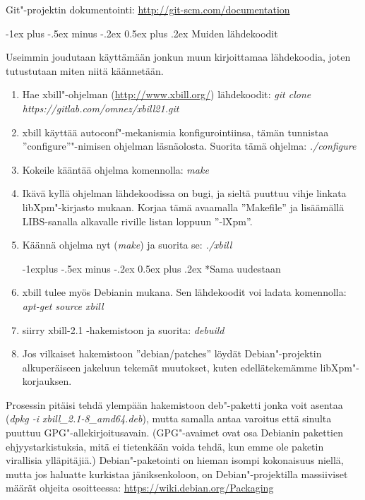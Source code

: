 \documentclass[12pt,portrait,a4]{article}
\makeatletter
\renewcommand{\section}{\@startsection{section}{1}{0mm}%
                                {-1ex plus -.5ex minus -.2ex}%
                                {0.5ex plus .2ex}%
                                {\normalfont\large\bfseries}}
\renewcommand{\subsection}{\@startsection{subsection}{2}{0mm}%
                                {-1explus -.5ex minus -.2ex}%
                                {0.5ex plus .2ex}%
                                {\normalfont\normalsize\bfseries}}
\makeatother
\begin{document}
Git"-projektin dokumentointi: \url{http://git-scm.com/documentation}


\section{Muiden lähdekoodit}

Useimmin joudutaan käyttämään jonkun muun kirjoittamaa lähdekoodia, joten
tutustutaan miten niitä käännetään.

\begin{enumerate}
\item Hae xbill"-ohjelman (\url{http://www.xbill.org/}) lähdekoodit:
\emph{git clone https://gitlab.com/omnez/xbill21.git}
\item xbill käyttää autoconf"-mekanismia konfigurointiinsa, tämän tunnistaa
''configure''"-nimisen ohjelman läsnäolosta.  Suorita tämä ohjelma:
\emph{./configure}
\item Kokeile kääntää ohjelma komennolla: \emph{make}
\item Ikävä kyllä ohjelman lähdekoodissa on bugi, ja sieltä puuttuu vihje
linkata libXpm"-kirjasto mukaan.  Korjaa tämä avaamalla ''Makefile'' ja
lisäämällä LIBS-sanalla alkavalle riville listan loppuun ''-lXpm''.
\item Käännä ohjelma nyt (\emph{make}) ja suorita se: \emph{./xbill}

\subsection*{Sama uudestaan}

\item xbill tulee myös Debianin mukana.  Sen lähdekoodit voi ladata
komennolla: \emph{apt-get source xbill}
\item siirry xbill-2.1 -hakemistoon ja suorita: \emph{debuild}
\item Jos vilkaiset hakemistoon ''debian/patches'' löydät Debian"-projektin
alkuperäiseen jakeluun tekemät muutokset, kuten edellätekemämme
libXpm"-korjauksen.
\end{enumerate}

Prosessin pitäisi tehdä ylempään hakemistoon deb"-paketti jonka voit asentaa
(\emph{dpkg -i xbill\_2.1-8\_amd64.deb}), mutta samalla antaa varoitus että
sinulta puuttuu GPG"-allekirjoitusavain.  (GPG"-avaimet ovat osa Debianin
pakettien ehjyystarkistuksia, mitä ei tietenkään voida tehdä, kun emme ole
paketin virallisia ylläpitäjiä.) Debian"-paketointi on hieman isompi
kokonaisuus niellä, mutta jos haluatte kurkistaa jäniksenkoloon, on
Debian"-projektilla massiiviset määrät ohjeita osoitteessa:
\url{https://wiki.debian.org/Packaging}
\end{document}
